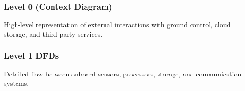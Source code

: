 \subsubsection{Level 0 (Context Diagram)}
High-level representation of external interactions with ground control, cloud storage, and third-party services.

\subsubsection{Level 1 DFDs}
Detailed flow between onboard sensors, processors, storage, and communication systems.
